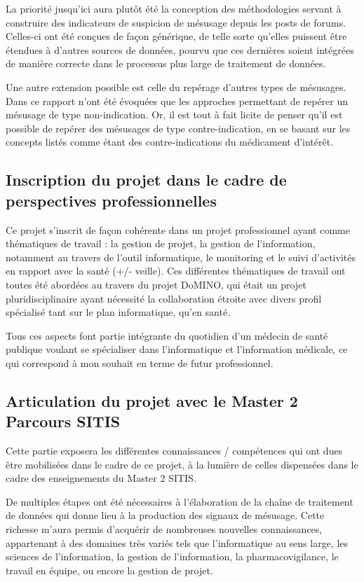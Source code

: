 \documentclass[a4paper, 12pt, openany, oneside, abstract=on]{article} %
\begin{document}
La priorité jusqu'ici aura plutôt été la conception des méthodologies servant à construire des indicateurs de suspicion de mésusage depuis les posts de forums. Celles-ci ont été conçues de façon générique, de telle sorte qu'elles puissent être étendues à d'autres sources de données, pourvu que ces dernières soient intégrées de manière correcte dans le processus plus large de traitement de données.

Une autre extension possible est celle du repérage d'autres types de mésusages. Dans ce rapport n'ont été évoquées que les approches permettant de repérer un mésusage de type \og{}non-indication\fg{}. Or, il est tout à fait licite de penser qu'il est possible de repérer des mésusages de type \og{}contre-indication\fg{}, en se basant sur les concepts listés comme étant des contre-indications du médicament d'intérêt.

\subsection{Inscription du projet dans le cadre de perspectives professionnelles}

Ce projet s'inscrit de façon cohérente dans un projet professionnel ayant comme thématiques de travail : la gestion de projet, la gestion de l'information, notamment au travers de l'outil informatique, le monitoring et le suivi d'activités en rapport avec la santé (+/- veille). Ces différentes thématiques de travail ont toutes été abordées au travers du projet DoMINO, qui était un projet pluridisciplinaire ayant nécessité la collaboration étroite avec divers profil spécialisé tant sur le plan informatique, qu'en santé.

Tous ces aspects font partie intégrante du quotidien d'un médecin de santé publique voulant se spécialiser dans l'informatique et l'information médicale, ce qui correspond à mon souhait en terme de futur professionnel.

\subsection{Articulation du projet avec le Master 2 Parcours SITIS}
Cette partie exposera les différentes connaissances / compétences qui ont dues être mobilisées dans le cadre de ce projet, à la lumière de celles dispensées dans le cadre des enseignements du Master 2 SITIS.

De multiples étapes ont été nécessaires à l'élaboration de la chaîne de traitement de données qui donne lieu à la production des signaux de mésusage. Cette richesse m'aura permis d'acquérir de nombreuses nouvelles connaissances, appartenant à des domaines très variés tels que l'informatique au sens large, les sciences de l'information, la gestion de l'information, la pharmacovigilance, le travail en équipe, ou encore la gestion de projet.
\end{document}

